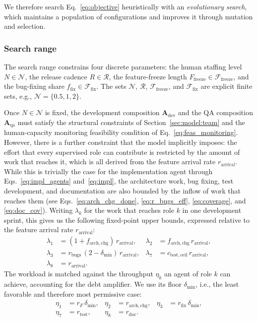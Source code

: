 \documentclass[smallextended]{svjour3}       %
\begin{document}
We therefore search Eq.~\eqref{eq:objective} heuristically with an \emph{evolutionary search}, which maintains a population of configurations and improves it through mutation and selection.

\subsubsection{Search range}

The search range constrains four discrete parameters: the human staffing level
$N \in \mathcal{N}$, the
release cadence $R \in \mathcal{R}$, the feature-freeze length $F_\mathrm{freeze} \in \mathcal{F}_\mathrm{freeze}$, and the bug-fixing share $f_\mathrm{fix} \in \mathcal{F}_\mathrm{fix}$.
The sets $\mathcal{N}$, $\mathcal{R}$, $\mathcal{F}_\mathrm{freeze}$, and $\mathcal{F}_\mathrm{fix}$ are
explicit finite sets, e.g., $\mathcal{N} = \{0.5, 1, 2\}$.

Once $N \in \mathcal{N}$ is fixed, the development composition $\mathbf{A}_\mathrm{dev}$ and the QA composition $\mathbf{A}_\mathrm{qa}$ must satisfy the structural constraints of Section~\ref{sec:model:team} and the human-capacity monitoring feasibility condition of Eq.~\eqref{eq:feas_monitoring}. However, there is a further constraint that the model implicitly imposes: the effort that every supervised role can contribute is restricted by the amount of work that reaches it, which is all derived from the feature arrival rate $r_\mathrm{arrival}$. While this is trivially the case for the implementation agent through Eqs.~\eqref{eq:impl_agents} and~\eqref{eq:impl}, the architecture work, bug fixing, test development, and documentation are also bounded by the inflow of work that reaches them (see Eqs.~\eqref{eq:arch_chg_done}, \eqref{eq:r_bugs_eff}, \eqref{eq:coverage}, and \eqref{eq:doc_cov}). Writing $\lambda_k$ for the work that reaches role $k$ in one development sprint, this gives us the following fixed-point upper bounds, expressed relative to the feature arrival rate $r_\mathrm{arrival}$:
\begin{align}
  \lambda_1 &= (1 + f_\mathrm{arch,chg})\,r_\mathrm{arrival}, &
  \lambda_2 &= f_\mathrm{arch,chg}\,r_\mathrm{arrival}, \nonumber\\
  \lambda_3 &= r_\mathrm{bugs}\,(2-\delta_\mathrm{min})\,r_\mathrm{arrival}, &
  \lambda_7 &= c_\mathrm{test,ceil}\,r_\mathrm{arrival}, \nonumber\\
  \lambda_8 &= r_\mathrm{arrival}.
  \label{eq:workload}
\end{align}
The workload is matched against the throughput $\eta_k$ an agent of role $k$ can achieve, accounting for the debt amplifier. We use its floor $\delta_\mathrm{min}$, i.e., the least favorable and therefore most permissive case:
\begin{equation}
  \begin{aligned}
    \eta_1 &= r_F\,\delta_\mathrm{min}, &
    \eta_2 &= r_\mathrm{arch,chg}, &
    \eta_3 &= r_\mathrm{fix}\,\delta_\mathrm{min}, \\
    \eta_7 &= r_\mathrm{test}, &
    \eta_8 &= r_\mathrm{doc}.
  \end{aligned}
  \label{eq:sat_rates}
\end{equation}
\end{document}
